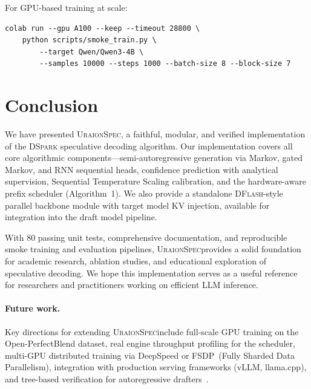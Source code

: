 \documentclass[11pt,a4paper]{article}
\newcommand{\UraionSpec}{\textsc{UraionSpec}}
\newcommand{\DSpark}{\textsc{DSpark}}
\newcommand{\DFlash}{\textsc{DFlash}}
\begin{document}
For GPU-based training at scale:
\begin{verbatim}
colab run --gpu A100 --keep --timeout 28800 \
    python scripts/smoke_train.py \
        --target Qwen/Qwen3-4B \
        --samples 10000 --steps 1000 --batch-size 8 --block-size 7
\end{verbatim}

\section{Conclusion}
\label{sec:conclusion}

We have presented \UraionSpec, a faithful, modular, and verified
implementation of the \DSpark{} speculative decoding algorithm. Our
implementation covers all core algorithmic components---semi-autoregressive
generation via Markov, gated Markov, and RNN sequential heads, confidence
prediction with analytical supervision, Sequential Temperature Scaling
calibration, and the hardware-aware prefix scheduler (Algorithm~1).
We also provide a standalone \DFlash-style parallel backbone module with
target model KV injection, available for integration into the draft model pipeline.

With 80 passing unit tests, comprehensive documentation, and reproducible
smoke training and evaluation pipelines, \UraionSpec provides a solid
foundation for academic research, ablation studies, and educational
exploration of speculative decoding. We hope this implementation serves as a
useful reference for researchers and practitioners working on efficient LLM
inference.

\paragraph{Future work.}
Key directions for extending \UraionSpec include full-scale GPU training on
the Open-PerfectBlend dataset, real engine throughput profiling for the
scheduler, multi-GPU distributed training via DeepSpeed or FSDP~(Fully Sharded Data Parallelism), integration
with production serving frameworks (vLLM, llama.cpp), and tree-based
verification for autoregressive drafters~\cite{spectrindecoding}.
\end{document}
